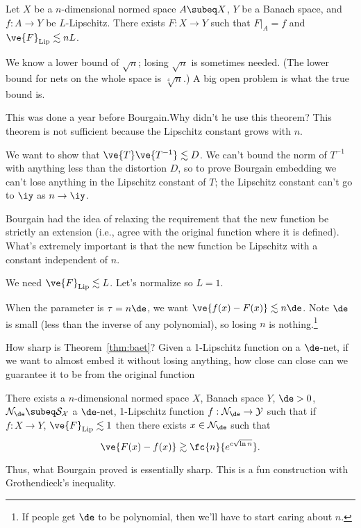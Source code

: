 \begin{thm}
Let $X$ be a $n$-dimensional normed space $A\subeq X$, $Y$ be a Banach space, and $f:A\to Y$ be $L$-Lipschitz. There exists $F:X\to Y$ such that $F|_A=f$ and $\ve{F}_{\text{Lip}}\lesssim nL$.
\end{thm}
We know a lower bound of $\sqrt n$; losing $\sqrt n$ is sometimes needed. (The lower bound for nets on the whole space is $\sqrt[4]{n}$.) A big open problem is what the true bound is. 

This was done a year before Bourgain.Why didn't he use this theorem? This theorem is not sufficient because the Lipschitz constant grows with $n$.

We want to show that $\ve{T}\ve{T^{-1}}\lesssim D$. We can't bound the norm of $T^{-1}$ with anything less than the distortion $D$, so to prove Bourgain embedding we can't lose anything in the Lipschitz constant of $T$; the Lipschitz constant can't go to $\iy$ as $n\to \iy$. 

Bourgain had the idea of relaxing the requirement that the new function be strictly an extension (i.e., agree with the original function where it is defined). What's extremely important  is that the new function be Lipschitz with a constant independent of $n$.
 
We need $\ve{F}_{\text{Lip}}\lesssim L$. 
Let's normalize so $L=1$. 

When the parameter is $\tau=n\de$, we want $\ve{f(x)-F(x)}\lesssim n\de$. Note $\de$ is small (less than the inverse of any polynomial), so losing $n$ is nothing.\footnote{If people get $\de$ to be polynomial, then we'll have to start caring about $n$.}

How sharp is Theorem~\ref{thm:baet}? Given a 1-Lipschitz function on a $\de$-net, if we want to almost embed it without losing anything, how close can close can we guarantee it to  be from the original function
\begin{thm}
There exists a $n$-dimensional normed space $X$, Banach space $Y$, $\de>0$, $\cal N_\de\subeq S_X$ a $\de$-net, 1-Lipschitz function $f:\cal N_\de\to Y$ such that if $f:X\to Y$, $\ve{F}_{\text{Lip}}\lesssim 1$ then there exists $x\in \cal N_\de$ such that 
\[
\ve{F(x)-f(x)}\gtrsim \fc{n}{e^{c\sqrt{\ln n}}}.
\]
\end{thm}
Thus, what Bourgain proved is essentially sharp.
This is a fun construction with Grothendieck's inequality.

